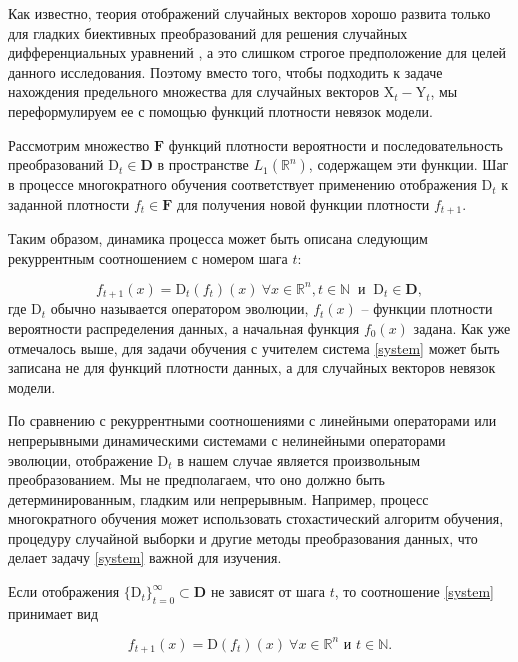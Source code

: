 Как известно, теория отображений случайных векторов хорошо развита только для гладких биективных преобразований для решения случайных дифференциальных уравнений \cite{caraballo2019applying, jornet2021uncertainty}, а это слишком строгое предположение для целей данного исследования. Поэтому вместо того, чтобы подходить к задаче нахождения предельного множества для случайных векторов $\text{X}_t - \text{Y}_t$, мы переформулируем ее с помощью функций плотности невязок модели. 

Рассмотрим множество $\textbf{F}$ функций плотности вероятности и последовательность преобразований $\text{D}_t \in \mathbf{D}$ в пространстве $L_1(\mathbb{R}^n)$, содержащем эти функции. Шаг в процессе многократного обучения соответствует применению отображения $\text{D}_t$ к заданной плотности $f_t \in \textbf{F}$ для получения новой функции плотности $f_{t+1}$.

Таким образом, динамика процесса может быть описана следующим рекуррентным соотношением с номером шага $t$:

\begin{equation}
    \label{system}
    f_{t+1}(x) = \text{D}_t(f_t)(x) ~ \forall x \in \mathbb{R}^n, t \in \mathbb{N}~\text{ и }~ \text{D}_t \in \mathbf{D},
\end{equation}
где $\text{D}_t$ обычно называется оператором эволюции, $f_t(x)$ -- функции плотности вероятности распределения данных, а начальная функция $f_0(x)$ задана. Как уже отмечалось выше, для задачи обучения с учителем система \eqref{system} может быть записана не для функций плотности данных, а для случайных векторов невязок модели.


По сравнению с рекуррентными соотношениями с линейными операторами или непрерывными динамическими системами с нелинейными операторами эволюции, отображение $\text{D}_t$ в нашем случае является произвольным преобразованием. Мы не предполагаем, что оно должно быть детерминированным, гладким или непрерывным. Например, процесс многократного обучения может использовать стохастический алгоритм обучения, процедуру случайной выборки и другие методы преобразования данных, что делает задачу \eqref{system} важной для изучения.

Если отображения $\{\text{D}_t\}_{t=0}^{\infty} \subset \mathbf{D}$ не зависят от шага $t$, то соотношение \eqref{system} принимает вид

\begin{equation}
    \label{system_aut}
    f_{t+1}(x) = \text{D}(f_t)(x) ~ \forall x \in \mathbb{R}^n \text{ и } t \in \mathbb{N}.
\end{equation}

